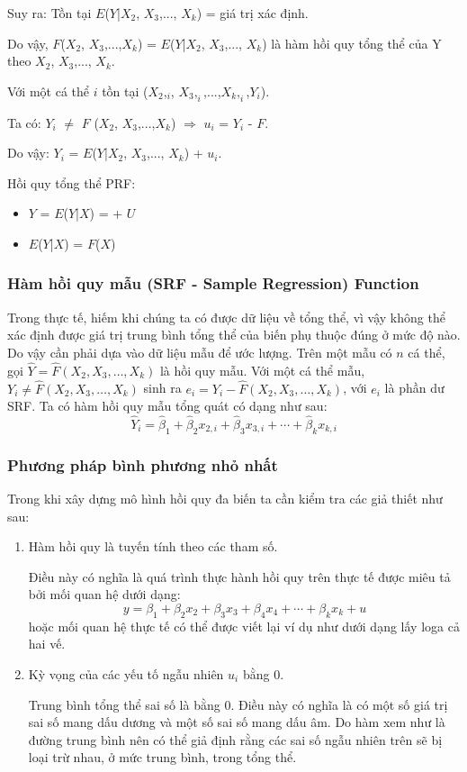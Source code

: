 Suy ra: Tồn tại $E$($Y$|$X_2$, $X_3$,..., $X_k$) = giá trị xác định.

Do vậy, $F$($X_2$, $X_3$,...,$X_k$) = $E$($Y$|$X_2$, $X_3$,..., $X_k$) là hàm hồi quy tổng thể của Y theo $X_2$, $X_3$,..., $X_k$.

Với một cá thể $i$ tồn tại ($X_2$,$_i$, $X_3,_i$,...,$X_k,_i$,$Y_i$).

Ta có: $Y_i$ $\ne$ $F$ ($X_2$, $X_3$,...,$X_k$) $\Rightarrow$ $u_i$ = $Y_i$ - $F$.

Do vậy: $Y_i$ = $E$($Y$|$X_2$, $X_3$,..., $X_k$) + $u_i$.

Hồi quy tổng thể PRF:
\begin{itemize}
    \item $Y$ = $E$($Y$|$X$) = + $U$
    \item $E$($Y$|$X$) = $F$($X$) 
\end{itemize}
\subsubsection{Hàm hồi quy mẫu (SRF - Sample Regression) Function}
Trong thực tế, hiếm khi chúng ta có được dữ liệu về tổng thể, vì vậy không thể xác định được giá trị trung bình tổng thể của biến phụ thuộc đúng ở mức độ nào. Do vậy cần phải dựa vào dữ liệu mẫu để ước lượng. Trên một mẫu có $n$ cá thể, gọi $\hat{Y} = \hat{F}(X_2, X_3, \ldots, X_k)$ là hồi quy mẫu. Với một cá thể mẫu, $Y_i \ne \hat{F}(X_2, X_3, \ldots, X_k)$ sinh ra 
$e_i = Y_i - \hat{F}(X_2, X_3, \ldots, X_k)$, với $e_i$ là phần dư SRF. Ta có hàm hồi quy mẫu tổng quát có dạng như sau:
\begin{equation*}
\hat{Y}_i = \hat{\beta}_1 + \hat{\beta}_2 x_{2,i} + \hat{\beta}_3 x_{3,i} + \cdots + \hat{\beta}_k x_{k,i}
\end{equation*}
\subsubsection{Phương pháp bình phương nhỏ nhất}
Trong khi xây dựng mô hình hồi quy đa biến ta cần kiểm tra các giả thiết như sau:

\begin{enumerate}
    \item Hàm hồi quy là tuyến tính theo các tham số.
    
    Điều này có nghĩa là quá trình thực hành hồi quy trên thực tế được miêu tả bởi mối quan hệ dưới dạng:
    \[
    y = \beta_1 + \beta_2 x_2 + \beta_3 x_3 + \beta_4 x_4 + \cdots + \beta_k x_k + u
    \]
    hoặc mối quan hệ thực tế có thể được viết lại ví dụ như dưới dạng lấy loga cả hai vế.
    
    \item Kỳ vọng của các yếu tố ngẫu nhiên $u_i$ bằng 0.
    
    Trung bình tổng thể sai số là bằng 0. Điều này có nghĩa là có một số giá trị sai số mang dấu dương và một số sai số mang dấu âm. Do hàm xem như là đường trung bình nên có thể giả định rằng các sai số ngẫu nhiên trên sẽ bị loại trừ nhau, ở mức trung bình, trong tổng thể.
\end{enumerate}

